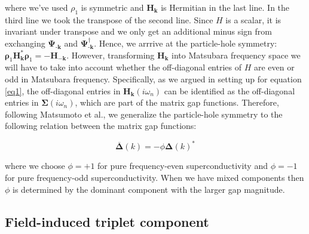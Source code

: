 \documentclass[a4paper,12pt]{article}
\begin{document}
\noindent where we've used ${\rho}_{1}$ is symmetric and $\textbf{H}_{\textbf{k}}$ is Hermitian in the last line. In the third line we took the transpose of the second line. Since $H$ is a scalar, it is invariant under transpose and we only get an additional minus sign from exchanging $\boldsymbol{\Psi}_{\textbf{-k}}$ and $\boldsymbol{\Psi}_{\textbf{-k}}^{\dag}$. Hence, we arrrive at the particle-hole symmetry: $\boldsymbol{\rho}_{1}\textbf{H}_{\textbf{k}}^{\ast}\boldsymbol{\rho}_{1}=-\textbf{H}_{-\textbf{k}}$. However, transforming $\textbf{H}_{\textbf{k}}$ into Matsubara frequency space we will have to take into account whether the off-diagonal entries of $H$ are even or odd in Matsubara frequency. Specifically, as we argued in setting up for equation \ref{eq1}, the off-diagonal entries in $\textbf{H}_{\textbf{k}}(i\omega_{n})$ can be identified as the off-diagonal entries in $\boldsymbol{\Sigma}(i\omega_{n})$, which are part of the matrix gap functions. Therefore, following Matsumoto et al., we generalize the particle-hole symmetry to the following relation between the matrix gap functions:

\begin{equation} \label{eq6}
    \overline{\boldsymbol{\Delta}}(k)=-\phi\boldsymbol{\Delta}(k)^{\ast}
\end{equation}

\noindent where we choose $\phi=+1$ for pure frequency-even superconductivity and $\phi=-1$ for pure frequency-odd superconductivity. When we have mixed components then $\phi$ is determined by the dominant component with the larger gap magnitude.

\subsection{Field-induced triplet component}
\end{document}
